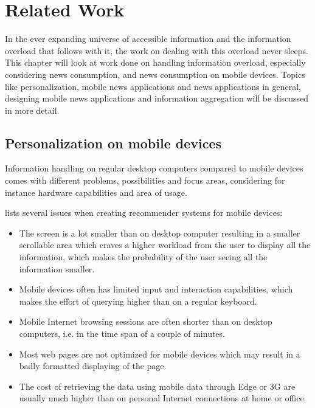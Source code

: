 \chapter{Related Work}
In the ever expanding universe of accessible information and the information overload that follows with it, the work on dealing with this overload never sleeps. This chapter will look at work done on handling information overload, especially considering news consumption, and news consumption on mobile devices. Topics like personalization, mobile news applications and news applications in general, designing mobile news applications and information aggregation will be discussed in more detail.

\section{Personalization on mobile devices}

Information handling on regular desktop computers compared to mobile devices comes with different problems, possibilities and focus areas, considering for instance hardware capabilities and area of usage. 


\cite{ricci2010mobile} lists several issues when creating recommender systems for mobile devices:

\begin{itemize}

\item The screen is a lot smaller than on desktop computer resulting in a smaller scrollable area which craves a higher workload from the user to display all the information, which makes the probability of the user seeing all the information smaller.

\item Mobile devices often has limited input and interaction capabilities, which makes the effort of querying higher than on a regular keyboard.

\item Mobile Internet browsing sessions are often shorter than on desktop computers, i.e. in the time span of a couple of minutes.

\item Most web pages are not optimized for mobile devices which may result in a badly formatted displaying of the page.

\item The cost of retrieving the data using mobile data through Edge or 3G are usually much higher than on personal Internet connections at home or office.
\end{itemize}

